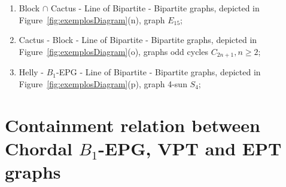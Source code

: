 \documentclass[9pt]{entcs}
\newtheorem{defi}{Definition}[section]
\begin{document}
\begin{enumerate}[label=(\arabic*)]
      \item Block $\cap$  Cactus -  Line of Bipartite - Bipartite graphs, depicted in Figure~\ref{fig:exemplosDiagram}(n), graph $E_{15}$;%
      \item Cactus - Block -  Line of Bipartite - Bipartite graphs, depicted in Figure~\ref{fig:exemplosDiagram}(o), graphs odd cycles $C_{2n+1},n\geq 2$;%
      \item Helly - $B_1$-EPG -  Line of Bipartite - Bipartite graphs, depicted in Figure~\ref{fig:exemplosDiagram}(p), graph 4-sun $S_4$;%
\end{enumerate}





    




\section{Containment relation between Chordal $B_1$-EPG, VPT and EPT graphs }
\end{document}
